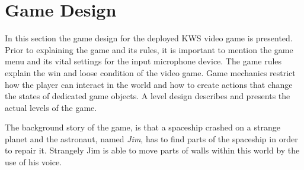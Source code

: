 
\section{Game Design}\label{sec:game_design}
\thesisStateReady
In this section the game design for the deployed KWS video game is presented.
Prior to explaining the game and its rules, it is important to mention the game menu and its vital settings for the input microphone device.
The game rules explain the win and loose condition of the video game.
Game mechanics restrict how the player can interact in the world and how to create actions that change the states of dedicated game objects.
A level design describes and presents the actual levels of the game.

The background story of the game, is that a spaceship crashed on a strange planet and the astronaut, named \emph{Jim}, has to find parts of the spaceship in order to repair it.
Strangely Jim is able to move parts of walls within this world by the use of his voice.



